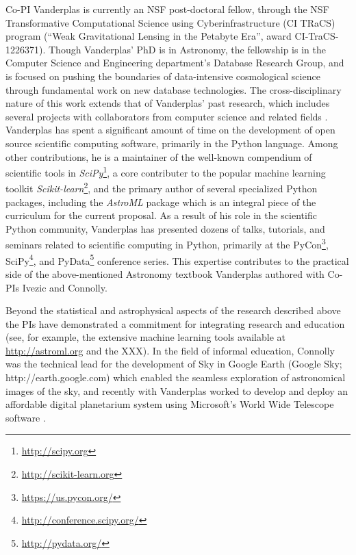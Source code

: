 Co-PI Vanderplas is currently an NSF post-doctoral fellow, through the NSF
Transformative Computational Science using Cyberinfrastructure (CI TRaCS)
program (``Weak Gravitational Lensing in the Petabyte Era'', award
CI-TraCS-1226371).
Though Vanderplas' PhD is in Astronomy, the fellowship is in the Computer
Science and Engineering department's Database Research Group, and is focused
on pushing the boundaries of data-intensive cosmological science through
fundamental work on new database technologies. The cross-disciplinary nature
of this work extends that of Vanderplas' past research, which includes several
projects with collaborators from computer science and related fields
\cite{scikit-learn2, Xiong2011, daniel2011, scikit-learn1}.
Vanderplas has spent a significant amount of time on the development of
open source scientific computing software, primarily in the Python
language.  Among other contributions,
he is a maintainer of the well-known compendium of scientific tools in
{\it SciPy}\footnote{\url{http://scipy.org}}, a core contributer to the
popular machine learning toolkit
{\it Scikit-learn}\footnote{\url{http://scikit-learn.org}},
and the primary author of several specialized Python packages,
including the {\it AstroML} package which is an integral piece of the
curriculum for the current proposal.
As a result of his role in the scientific Python community, Vanderplas
has presented dozens of talks, tutorials, and seminars related to scientific
computing in Python, primarily at the
PyCon\footnote{\url{https://us.pycon.org/}},
SciPy\footnote{\url{http://conference.scipy.org/}},
and PyData\footnote{\url{http://pydata.org/}} conference series.
This expertise contributes to the practical side of the above-mentioned
Astronomy textbook Vanderplas authored with Co-PIs Ivezic and Connolly.

Beyond the statistical and astrophysical aspects of the research
described above the PIs have demonstrated a commitment for integrating
research and education (see, for example, the extensive machine
learning tools available at \url{http://astroml.org} and the XXX). In
the field of informal education, Connolly was the technical lead for
the development of Sky in Google Earth (Google Sky;
http://earth.google.com) which enabled the seamless exploration of
astronomical images of the sky, and recently with Vanderplas worked to
develop and deploy an affordable digital planetarium system using Microsoft's
World Wide Telescope software \cite{rosenfield2011}.

